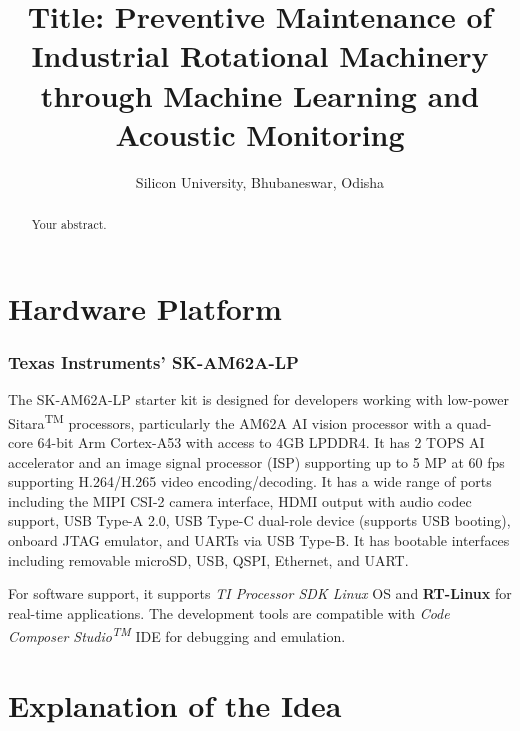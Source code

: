 \documentclass[12pt]{article}
\title{Title: Preventive Maintenance of Industrial Rotational Machinery through Machine Learning and Acoustic Monitoring}
\author{Silicon University, Bhubaneswar, Odisha}
\begin{document}
\maketitle

\begin{abstract}
Your abstract.
\end{abstract}

\section{Hardware Platform}

\subsubsection*{Texas Instruments’ SK-AM62A-LP}


The SK-AM62A-LP starter kit is designed for developers working with low-power Sitara\textsuperscript{TM} processors, particularly the AM62A AI vision processor with a quad-core 64-bit Arm Cortex-A53 with access to 4GB LPDDR4.
It has 2 TOPS AI accelerator and an image signal processor (ISP) supporting up to 5 MP at 60 fps supporting H.264/H.265 video encoding/decoding. 
It has a wide range of ports including the MIPI CSI-2 camera interface, HDMI output with audio codec support, USB Type-A 2.0, USB Type-C dual-role device (supports USB booting), onboard JTAG emulator, and UARTs via USB Type-B.
It has bootable interfaces including removable microSD, USB, QSPI, Ethernet, and UART.

For software support, it supports \textit{TI Processor SDK Linux} OS and \textbf{RT-Linux} for real-time applications. The development tools are compatible with \textit{Code Composer Studio\textsuperscript{TM}} IDE for debugging and emulation.

\section{Explanation of the Idea}
\end{document}
